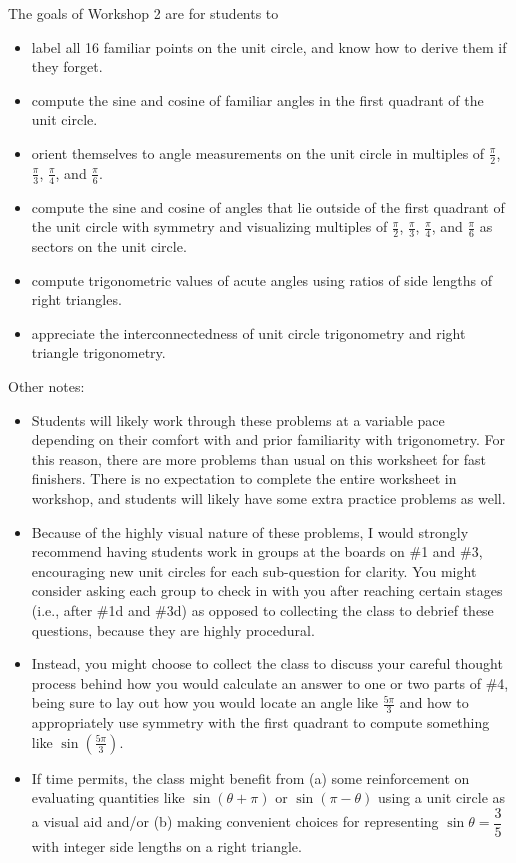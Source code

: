 \documentclass{article}
\begin{document}
\begin{workshop}
\newline
    The goals of Workshop 2 are for students to
    \begin{itemize}
        \item label all 16 familiar points on the unit circle, and know how to derive them if they forget.
        \item compute the sine and cosine of familiar angles in the first quadrant of the unit circle. 
        \item orient themselves to angle measurements on the unit circle in multiples of $\frac{\pi}{2}$, $\frac{\pi}{3}$, $\frac{\pi}{4}$, and $\frac{\pi}{6}$. 
        \item compute the sine and cosine of angles that lie outside of the first quadrant of the unit circle with symmetry and visualizing multiples of $\frac{\pi}{2}$, $\frac{\pi}{3}$, $\frac{\pi}{4}$, and $\frac{\pi}{6}$ as sectors on the unit circle.
        \item compute trigonometric values of acute angles using ratios of side lengths of right triangles.
        \item appreciate the interconnectedness of unit circle trigonometry and right triangle trigonometry.
    \end{itemize}
    
    Other notes:
    \begin{itemize}
        \item  Students will likely work through these problems at a variable pace depending on their comfort with and prior familiarity with trigonometry. For this reason, there are more problems than usual on this worksheet for fast finishers. There is no expectation to complete the entire worksheet in workshop, and students will likely have some extra practice problems as well.
        \item Because of the highly visual nature of these problems, I would strongly recommend having students work in groups at the boards on \#1 and \#3, encouraging new unit circles for each sub-question for clarity. You might consider asking each group to check in with you after reaching certain stages (i.e., after \#1d and \#3d) as opposed to collecting the class to debrief these questions, because they are highly procedural. 
        \item Instead, you might choose to collect the class to discuss your careful thought process behind how you would calculate an answer to one or two parts of \#4, being sure to lay out how you would locate an angle like $\frac{5\pi}{3}$ and how to appropriately use symmetry with the first quadrant to compute something like $\sin \left(\frac{5\pi}{3}\right)$.
        \item If time permits, the class might benefit from (a) some reinforcement on evaluating quantities like $\sin(\theta + \pi)$ or $\sin(\pi-\theta)$ using a unit circle as a visual aid and/or (b) making convenient choices for representing $\sin \theta = \dfrac{3}{5}$ with integer side lengths on a right triangle.
    \end{itemize}
        

\end{workshop}
\end{document}
